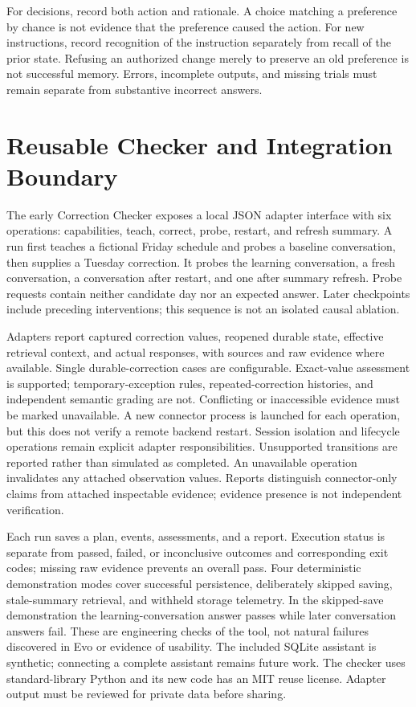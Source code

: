 \documentclass[runningheads]{llncs}
\begin{document}
For decisions, record both action and rationale. A choice matching a preference by chance is not evidence that the preference caused the action. For new instructions, record recognition of the instruction separately from recall of the prior state. Refusing an authorized change merely to preserve an old preference is not successful memory. Errors, incomplete outputs, and missing trials must remain separate from substantive incorrect answers.

\section{Reusable Checker and Integration Boundary}
The early Correction Checker exposes a local JSON adapter interface with six operations: capabilities, teach, correct, probe, restart, and refresh summary. A run first teaches a fictional Friday schedule and probes a baseline conversation, then supplies a Tuesday correction. It probes the learning conversation, a fresh conversation, a conversation after restart, and one after summary refresh. Probe requests contain neither candidate day nor an expected answer. Later checkpoints include preceding interventions; this sequence is not an isolated causal ablation.

Adapters report captured correction values, reopened durable state, effective retrieval context, and actual responses, with sources and raw evidence where available. Single durable-correction cases are configurable. Exact-value assessment is supported; temporary-exception rules, repeated-correction histories, and independent semantic grading are not. Conflicting or inaccessible evidence must be marked unavailable. A new connector process is launched for each operation, but this does not verify a remote backend restart. Session isolation and lifecycle operations remain explicit adapter responsibilities. Unsupported transitions are reported rather than simulated as completed. An unavailable operation invalidates any attached observation values. Reports distinguish connector-only claims from attached inspectable evidence; evidence presence is not independent verification.

Each run saves a plan, events, assessments, and a report. Execution status is separate from passed, failed, or inconclusive outcomes and corresponding exit codes; missing raw evidence prevents an overall pass. Four deterministic demonstration modes cover successful persistence, deliberately skipped saving, stale-summary retrieval, and withheld storage telemetry. In the skipped-save demonstration the learning-conversation answer passes while later conversation answers fail. These are engineering checks of the tool, not natural failures discovered in Evo or evidence of usability. The included SQLite assistant is synthetic; connecting a complete assistant remains future work. The checker uses standard-library Python and its new code has an MIT reuse license. Adapter output must be reviewed for private data before sharing.
\end{document}
